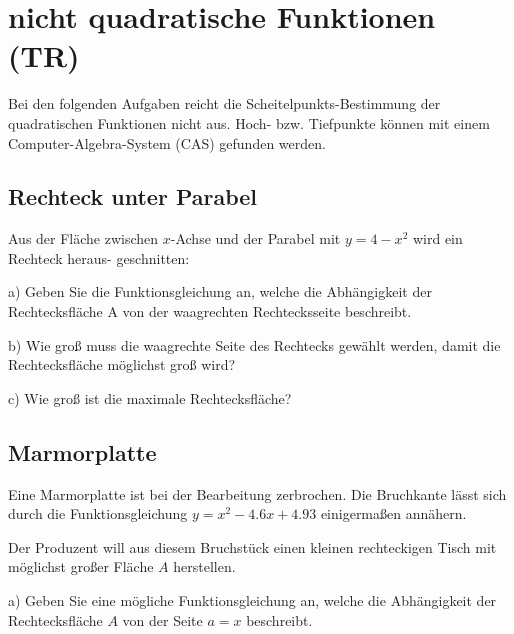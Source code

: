 \section{nicht quadratische Funktionen (TR)}
Bei den folgenden Aufgaben reicht die Scheitelpunkts-Bestimmung der
quadratischen Funktionen nicht aus. Hoch- bzw. Tiefpunkte können mit
einem Computer-Algebra-System (CAS) gefunden werden.

\subsection{Rechteck unter Parabel}

Aus der Fläche zwischen $x$-Achse und der
Parabel mit $y=4-x^2$ wird ein Rechteck heraus-
geschnitten:

a) 
Geben Sie die Funktionsgleichung an,
welche die Abhängigkeit der Rechtecksfläche A von der waagrechten
Rechtecksseite beschreibt.

b) 
Wie groß muss die waagrechte Seite des
Rechtecks gewählt werden, damit die
Rechtecksfläche möglichst groß wird?

c)
Wie groß ist die maximale Rechtecksfläche?

\subsection{Marmorplatte}

Eine Marmorplatte ist bei der Bearbeitung zerbrochen. Die Bruchkante lässt sich durch die Funktionsgleichung $y=x^2 - 4.6x + 4.93$ einigermaßen annähern.

Der Produzent will aus diesem Bruchstück einen kleinen rechteckigen Tisch mit möglichst großer
Fläche $A$ herstellen.


a)
Geben Sie eine mögliche Funktionsgleichung an, welche die Abhängigkeit
der Rechtecksfläche $A$ von der Seite $a=x$ beschreibt.

